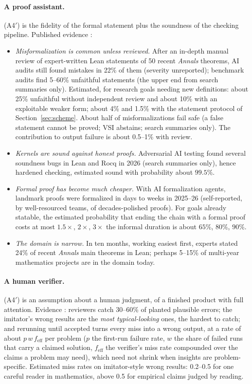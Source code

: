 \documentclass[11pt]{article}
\theoremstyle{definition}
\theoremstyle{remark}
\begin{document}
\paragraph{A proof assistant.} (A4$'$) is the fidelity of the formal statement plus the soundness of the checking pipeline. Published evidence \cite{threadT}:
\begin{itemize}[nosep]
\item \emph{Misformalization is common unless reviewed.} After an in-depth manual review of expert-written Lean statements of 50 recent \emph{Annals} theorems, AI audits still found mistakes in 22\% of them (severity unreported); benchmark audits find 5--60\% unfaithful statements (the upper end from search summaries only). Estimated, for research goals needing new definitions: about 25\% unfaithful without independent review and about 10\% with an exploitable weaker form; about 4\% and 1.5\% with the statement protocol of Section~\ref{sec:scheme}. About half of misformalizations fail safe (a false statement cannot be proved; VSI abstains; search summaries only). The contribution to output failure is about 0.5--1\% with review.
\item \emph{Kernels are sound against honest proofs.} Adversarial AI testing found several soundness bugs in Lean and Rocq in 2026 (search summaries only), hence hardened checking, estimated sound with probability about $99.5\%$.
\item \emph{Formal proof has become much cheaper.} With AI formalization agents, landmark proofs were formalized in days to weeks in 2025--26 (self-reported, by well-resourced teams, of decades-polished proofs). For goals already statable, the estimated probability that ending the chain with a formal proof costs at most $1.5\times$, $2\times$, $3\times$ the informal duration is about $65\%$, $80\%$, $90\%$.
\item \emph{The domain is narrow.} In ten months, working easiest first, experts stated 24\% of recent \emph{Annals} main theorems in Lean; perhaps 5--15\% of multi-year mathematics projects are in the domain today.
\end{itemize}

\paragraph{A human verifier.} (A4$'$) is an assumption about a human judgment, of a finished product with full attention. Evidence \cite{threadL,threadS}: reviewers catch 30--60\% of planted plausible errors; the imitator's wrong results are the \emph{most typical-looking} ones, the hardest to catch; and rerunning until accepted turns every miss into a wrong output, at a rate of about $p\,w\,f_{\text{eff}}$ per problem ($p$ the first-run failure rate, $w$ the share of failed runs that carry a claimed solution, $f_{\text{eff}}$ the verifier's miss rate compounded over the claims a problem may need), which need not shrink when insights are problem-specific. Estimated miss rates on imitator-style wrong results: 0.2--0.5 for one careful reader in mathematics, above 0.5 for empirical claims judged by reading.
\end{document}
